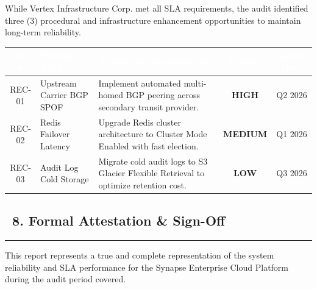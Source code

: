 \documentclass[11pt,a4paper]{scrartcl}
\begin{document}
While Vertex Infrastructure Corp. met all SLA requirements, the audit identified three (3) procedural and infrastructure enhancement opportunities to maintain long-term reliability.

\vspace{4pt}

\begin{small}
\begin{tabularx}{\textwidth}{@{} c l X c c @{}}
    \toprule
    \rowcolor{navyblue}
    \textcolor{white}{\textbf{Ref \#}} & 
    \textcolor{white}{\textbf{Finding Area}} & 
    \textcolor{white}{\textbf{Auditor Recommendation}} & 
    \textcolor{white}{\textbf{Priority}} & 
    \textcolor{white}{\textbf{Target Date}} \\
    \midrule
    \rowcolor{cardbg} REC-01 & Upstream Carrier BGP SPOF & Implement automated multi-homed BGP peering across secondary transit provider. & \textcolor{statusred}{\textbf{HIGH}} & Q2 2026 \\
    \rowcolor{white} REC-02 & Redis Failover Latency & Upgrade Redis cluster architecture to Cluster Mode Enabled with fast election. & \textcolor{statusamber}{\textbf{MEDIUM}} & Q1 2026 \\
    \rowcolor{cardbg} REC-03 & Audit Log Cold Storage & Migrate cold audit logs to S3 Glacier Flexible Retrieval to optimize retention cost. & \textcolor{brandblue}{\textbf{LOW}} & Q3 2026 \\
    \bottomrule
\end{tabularx}
\end{small}

\vspace{10pt}

\subsection*{\textcolor{navyblue}{\faLock\ 8. Formal Attestation \& Sign-Off}}
\hrule
\vspace{6pt}

This report represents a true and complete representation of the system reliability and SLA performance for the Synapse Enterprise Cloud Platform during the audit period covered.

\vspace{10pt}
\end{document}
